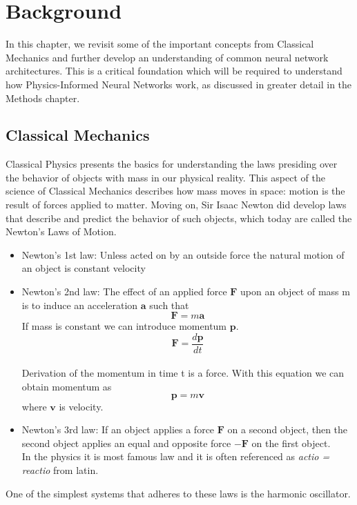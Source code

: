\chapter{Background}\label{background}
In this chapter, we revisit some of the important concepts from Classical Mechanics and further develop an understanding of common neural network architectures. This is a critical foundation which will be required to understand how Physics-Informed Neural Networks work, as discussed in greater detail in the Methods chapter. 
\section{Classical Mechanics}\label{cs}
Classical Physics presents the basics for understanding the laws presiding over the behavior of objects with mass in our physical reality. This aspect of the science of Classical Mechanics describes how mass moves in space: motion is the result of forces applied to matter. Moving on, Sir Isaac Newton did develop laws that describe and predict the behavior of such objects, which today are called the Newton's Laws of Motion.\cite{ClassPhy}
\begin{itemize}
	\item Newton's 1st law: Unless acted on by an outside force the natural motion of an object is constant velocity
	\item Newton’s 2nd law: The effect of an applied force $\mathbf{F}$ upon an object of mass
	m is to induce an acceleration $\mathbf{a}$ such that $$\mathbf{F}=m\mathbf{a}$$
	If mass is constant we can introduce momentum $\mathbf{p}$.
	$$\mathbf{F}=\frac{d\mathbf{p}}{dt}$$ \\
	Derivation of the momentum in time t is a force. 
	With this equation we can obtain momentum as $$\mathbf{p}=m\mathbf{v}$$ where $\mathbf{v}$ is velocity.
	\item Newton’s 3rd law: If an object applies a force $\mathbf{F}$ on a second object, then the second object applies an equal and opposite force $-\mathbf{F}$ on the first object.\\
	In the physics it is most famous law and it is often referenced as  \textit{actio = reactio} from latin.
\end{itemize}
One of the simplest systems that adheres to these laws is the harmonic oscillator.
